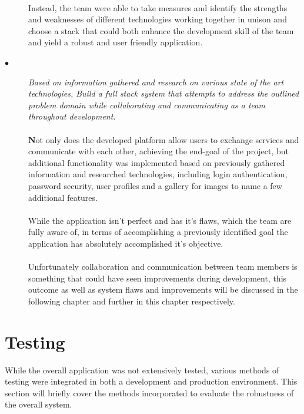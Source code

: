 \begin{description}
  \paragraph{}
  Instead, the team were able to take measures and identify the strengths and weaknesses of different technologies working together in unison and choose a stack that could both enhance the development skill of the team and yield a robust and user friendly application.
  
  \item[$\bullet$] \textit{Based on information gathered and research on various state of the art technologies, Build a full stack system that attempts to address the outlined problem domain while collaborating and communicating as a team throughout development}. 

  \paragraph{}
  \textbf{N}ot only does the developed platform allow users to exchange services and communicate with each other, achieving the end-goal of the project, but additional functionality was implemented based on previously gathered information and researched technologies, including login authentication, password security, user profiles and a gallery for images to name a few additional features.
  
  \paragraph{}
  While the application isn't perfect and has it's flaws, which the team are fully aware of, in terms of accomplishing a previously identified goal the application has absolutely accomplished it's objective. 
  
  \paragraph{}
  Unfortunately collaboration and communication between team members is something that could have seen improvements during development, this outcome as well as system flaws and improvements will be discussed in the following chapter and further in this chapter respectively.
\end{description}

\section{Testing}
While the overall application was not extensively tested, various methods of testing were integrated in both a development and production environment. This section will briefly cover the methods incorporated to evaluate the robustness of the overall system.

